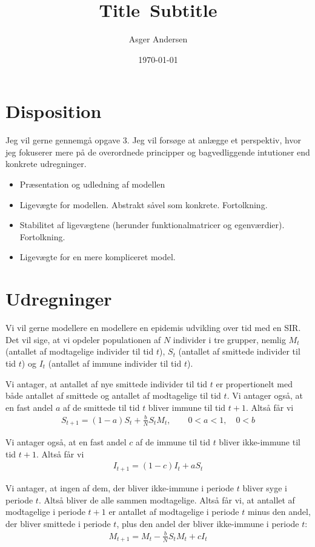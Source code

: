 \documentclass[12pt]{article}
\title{
  Title\
  \large Subtitle
}
\author{Asger Andersen}
\date{\today}
\begin{document}
\section{Disposition}

Jeg vil gerne gennemgå opgave 3. Jeg vil forsøge at anlægge et perspektiv, hvor jeg fokuserer mere på de overordnede principper og bagvedliggende intutioner end konkrete udregninger.

\begin{itemize}
\item Præsentation og udledning af modellen
\item Ligevægte for modellen. Abstrakt såvel som konkrete. Fortolkning.
\item Stabilitet af ligevægtene (herunder funktionalmatricer og egenværdier). Fortolkning.
\item Ligevægte for en mere kompliceret model.
\end{itemize}

\section{Udregninger}

Vi vil gerne modellere en modellere en epidemis udvikling over tid med en SIR. Det vil sige, at vi opdeler populationen af $N$ individer i tre grupper, nemlig $M_t$ (antallet af modtagelige individer til tid $t$), $S_t$ (antallet af smittede individer til tid $t$) og $I_t$ (antallet af immune individer til tid $t$). 

Vi antager, at antallet af nye smittede individer til tid $t$ er propertionelt med både antallet af smittede og antallet af modtagelige til tid $t$. Vi antager også, at en fast andel $a$ af de smittede til tid $t$ bliver immune til tid $t+1$. Altså får vi
\begin{align}
S_{t+1} = (1-a)S_t + \frac{b}{N}S_tM_t, \qquad 0<a<1,\quad 0<b
\end{align}

Vi antager også, at en fast andel $c$ af de immune til tid $t$ bliver ikke-immune til tid $t+1$. Altså får vi
\begin{align}
I_{t+1} = (1-c)I_t + aS_t
\end{align}

Vi antager, at ingen af dem, der bliver ikke-immune i periode $t$ bliver syge i periode $t$. Altså bliver de alle sammen modtagelige. Altså får vi, at antallet af modtagelige i periode $t+1$ er antallet af modtagelige i periode $t$ minus den andel, der bliver smittede i periode $t$, plus den andel der bliver ikke-immune i periode $t$:
\begin{align}
M_{t+1} = M_t - \frac{b}{N}S_tM_t + cI_t
\end{align}
\end{document}
